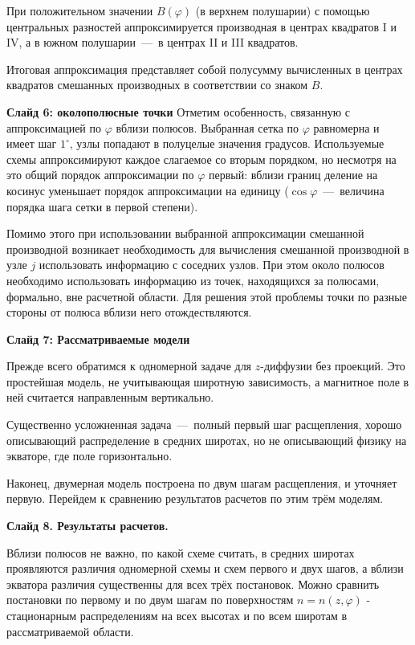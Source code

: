 \documentclass[2pt, a4paper, fleqn]{extarticle}
\begin{document}
При положительном значении $B(\varphi)$ (в верхнем полушарии) с помощью центральных разностей аппроксимируется производная в центрах квадратов I и IV, а в южном полушарии~---~в центрах II и III квадратов.

Итоговая аппроксимация представляет собой полусумму вычисленных в центрах квадратов смешанных производных в соответствии со знаком $B$.



\medskip

{\bf Слайд 6: околополюсные точки}
Отметим особенность, связанную с аппроксимацией по $\varphi$ вблизи полюсов. Выбранная сетка по $\varphi$ равномерна и имеет шаг $1^\circ$, узлы попадают в полуцелые значения градусов. Используемые схемы аппроксимируют каждое слагаемое со вторым порядком, но несмотря на это общий порядок аппроксимации по $\varphi$ первый: вблизи границ деление на косинус уменьшает порядок аппроксимации на единицу ($\cos\varphi$~---~величина порядка шага сетки в первой степени).

Помимо этого при использовании выбранной аппроксимации смешанной производной возникает необходимость для вычисления смешанной производной в узле $j$ использовать информацию с соседних узлов. При этом около полюсов необходимо использовать информацию из точек, находящихся за полюсами, формально, вне расчетной области. Для решения этой проблемы точки по разные стороны от полюса вблизи него отождествляются.

\medskip

{\bf Слайд 7: Рассматриваемые модели}

Прежде всего обратимся к одномерной задаче для $z$-диффузии без проекций. Это простейшая модель, не учитывающая широтную зависимость, а магнитное поле в ней считается направленным вертикально.

Существенно усложненная задача~---~полный первый шаг расщепления, хорошо описывающий распределение в средних широтах, но не описывающий физику на экваторе, где поле горизонтально.

Наконец, двумерная модель построена по двум шагам расщепления, и уточняет первую. Перейдем к сравнению результатов расчетов по этим трём моделям.
\medskip

{\bf Слайд 8. Результаты расчетов.}


Вблизи полюсов не важно, по какой схеме считать, в средних широтах проявляются различия одномерной схемы и схем первого и двух шагов, а вблизи экватора различия существенны для всех трёх постановок.
Можно сравнить постановки по первому и по двум шагам по поверхностям $n = n(z, \varphi)$ - стационарным распределениям на всех высотах и по всем широтам в рассматриваемой области.
\end{document}
